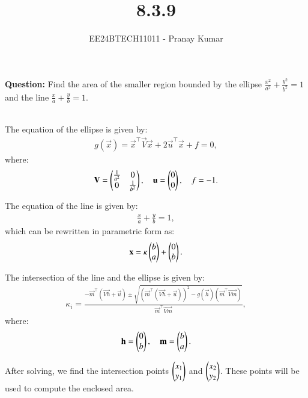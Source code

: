 \documentclass[journal]{IEEEtran}
\begin{document}

\vspace{3cm}

\title{8.3.9}
\author{EE24BTECH11011 - Pranay Kumar}
{\let\newpage\relax\maketitle}

\textbf{Question:}
Find the area of the smaller region bounded by the ellipse \(\frac{x^2}{a^2} + \frac{y^2}{b^2} = 1\) and the line \(\frac{x}{a} + \frac{y}{b} = 1\).

\solution\\

The equation of the ellipse is given by:
\begin{align}
g(\vec{x}) = \vec{x}^\top \vec{V} \vec{x} + 2\vec{u}^\top \vec{x} + f = 0,
\end{align}
where:
\begin{align}
\mathbf{V} = \begin{pmatrix}\frac{1}{a^2} & 0 \\ 0 & \frac{1}{b^2}\end{pmatrix}, \quad \mathbf{u} = \begin{pmatrix}0 \\ 0\end{pmatrix}, \quad f = -1.
\end{align}

The equation of the line is given by:
\begin{align}
\frac{x}{a} + \frac{y}{b} = 1,
\end{align}
which can be rewritten in parametric form as:
\begin{align}
\mathbf{x} = \kappa \begin{pmatrix}b \\ a\end{pmatrix} + \begin{pmatrix}0 \\ b\end{pmatrix}.
\end{align}

The intersection of the line and the ellipse is given by:
\begin{align}
\kappa_i = \frac{-\vec{m}^\top (\vec{Vh} + \vec{u}) \pm \sqrt{\left(\vec{m}^\top (\vec{Vh} + \vec{u})\right)^2 - g(\vec{h})(\vec{m}^\top \vec{Vm})}}{\vec{m}^\top \vec{Vm}},
\end{align}
where:
\begin{align}
\mathbf{h} = \begin{pmatrix}0 \\ b\end{pmatrix}, \quad \mathbf{m} = \begin{pmatrix}b \\ a\end{pmatrix}.
\end{align}

After solving, we find the intersection points \(\begin{pmatrix}x_1 \\ y_1\end{pmatrix}\) and \(\begin{pmatrix}x_2 \\ y_2\end{pmatrix}\). These points will be used to compute the enclosed area.
\end{document}
